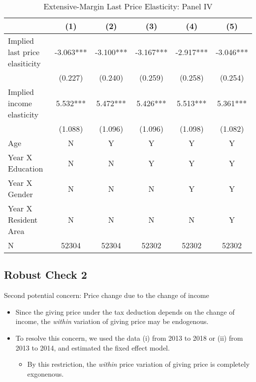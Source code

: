\documentclass[ review  , 3p ]{elsarticle}
\providecommand{\tightlist}{%
  \setlength{\itemsep}{0pt}\setlength{\parskip}{0pt}}
\begin{document}
  \begin{table}
  
  \caption{\label{tab:kableLastElasticity2Slide2}Extensive-Margin Last Price Elasticity: Panel IV}
  \centering
  \fontsize{7}{9}\selectfont
  \begin{tabular}[t]{lccccc}
  \toprule
   & (1) & (2) & (3) & (4) & (5)\\
  \midrule
  Implied last price elasiticity & -3.063*** & -3.100*** & -3.167*** & -2.917*** & -3.046***\\
   & (0.227) & (0.240) & (0.259) & (0.258) & (0.254)\\
  Implied income elasticity & 5.532*** & 5.472*** & 5.426*** & 5.513*** & 5.361***\\
   & (1.088) & (1.096) & (1.096) & (1.098) & (1.082)\\
  Age & N & Y & Y & Y & Y\\
  Year X Education & N & N & Y & Y & Y\\
  Year X Gender & N & N & N & Y & Y\\
  Year X Resident Area & N & N & N & N & Y\\
  N & 52304 & 52304 & 52302 & 52302 & 52302\\
  \bottomrule
  \end{tabular}
  \end{table}
  
  \hypertarget{robust-check-2}{%
  \subsection{Robust Check 2}\label{robust-check-2}}
  
  Second potential concern: Price change due to the change of income
  
  \begin{itemize}
  \tightlist
  \item
    Since the giving price under the tax deduction depends on the change of income, the \emph{within} variation of giving price may be endogenous.
  \item
    To resolve this concern, we used the data (i) from 2013 to 2018 or (ii) from 2013 to 2014, and estimated the fixed effect model.
  
    \begin{itemize}
    \tightlist
    \item
      By this restriction, the \emph{within} price variation of giving price is completely exgonenous.
    \end{itemize}
  \end{itemize}
  
\end{document}
